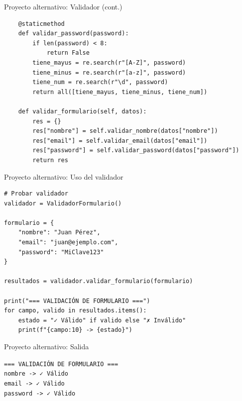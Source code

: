 \documentclass{beamer}
\begin{document}
\begin{frame}[fragile]{Proyecto alternativo: Validador (cont.) \faEdit}
\begin{lstlisting}
    @staticmethod
    def validar_password(password):
        if len(password) < 8:
            return False
        tiene_mayus = re.search(r"[A-Z]", password)
        tiene_minus = re.search(r"[a-z]", password)
        tiene_num = re.search(r"\d", password)
        return all([tiene_mayus, tiene_minus, tiene_num])
    
    def validar_formulario(self, datos):
        res = {}
        res["nombre"] = self.validar_nombre(datos["nombre"])
        res["email"] = self.validar_email(datos["email"])
        res["password"] = self.validar_password(datos["password"])
        return res
\end{lstlisting}
\end{frame}

\begin{frame}[fragile]{Proyecto alternativo: Uso del validador \faTerminal}
\begin{lstlisting}
# Probar validador
validador = ValidadorFormulario()

formulario = {
    "nombre": "Juan Pérez",
    "email": "juan@ejemplo.com",
    "password": "MiClave123"
}

resultados = validador.validar_formulario(formulario)

print("=== VALIDACIÓN DE FORMULARIO ===")
for campo, valido in resultados.items():
    estado = "✓ Válido" if valido else "✗ Inválido"
    print(f"{campo:10} -> {estado}")
\end{lstlisting}
\end{frame}

\begin{frame}[fragile]{Proyecto alternativo: Salida \faArrowCircleRight}
\begin{tcolorbox}[colback=green!10,colframe=green,title={\small\faArrowCircleRight \ Salida},coltitle=fg0,left=3pt,right=3pt,top=3pt,bottom=3pt,boxsep=2pt]
\small\texttt{=== VALIDACIÓN DE FORMULARIO ===\\
nombre     -> ✓ Válido\\
email      -> ✓ Válido\\
password   -> ✓ Válido}
\end{tcolorbox}
\end{frame}
\end{document}
